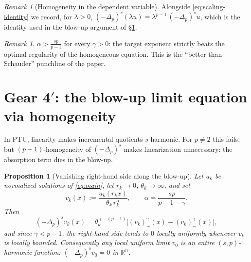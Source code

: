 \documentclass[11pt]{amsart}
\theoremstyle{plain}
\newtheorem{proposition}[theorem]{Proposition}
\theoremstyle{definition}
\theoremstyle{remark}
\newtheorem{remark}[theorem]{Remark}
\newcommand{\R}{\mathbb{R}}
\newcommand{\fpl}[1]{(-\Delta_p)^{s}#1}            %
\newcommand{\al}{\alpha}
\begin{document}
\begin{remark}[Homogeneity in the dependent variable]\label{rem:lambda}
Alongside \eqref{eq:scaling-identity} we record, for $\lambda>0$,
$\fpl{(\lambda u)}=\lambda^{p-1}\,\fpl{u}$, which is the identity used in
the blow-up argument of \S\ref{sec:homog}.
\end{remark}
\begin{remark}
$\al>\frac{sp}{p-1}$ for every $\gamma>0$: the target exponent strictly
beats the optimal regularity of the homogeneous equation. This is the
``better than Schauder'' punchline of the paper.
\end{remark}
\section{Gear 4$'$: the blow-up limit equation via homogeneity}\label{sec:homog}
In PTU, linearity makes incremental quotients $s$-harmonic. For $p\neq2$
this fails, but $(p-1)$-homogeneity of $\fpl{}$ makes linearization
unnecessary: the absorption term dies in the blow-up.
\begin{proposition}[Vanishing right-hand side along the blow-up]\label{prop:homog}
Let $u_k$ be normalized solutions of \eqref{eq:main}, let $r_k\to0$,
$\theta_k\to\infty$, and set
\[
  v_k(x):=\frac{u_k(r_kx)}{\theta_k\, r_k^{\al}},
  \qquad \al=\frac{sp}{p-1-\gamma}.
\]
Then
\[
  \fpl{v_k}(x)
  = \theta_k^{\,\gamma-(p-1)}
    \Big[ (v_k)_+^{\gamma}(x) - (v_k)_-^{\gamma}(x) \Big],
\]
and since $\gamma<p-1$, the right-hand side tends to $0$ locally uniformly
whenever $v_k$ is locally bounded. Consequently any local uniform limit
$v_0$ is an entire $(s,p)$-harmonic function:
$\fpl{v_0}=0$ in $\R^n$.
\end{proposition}
\end{document}
